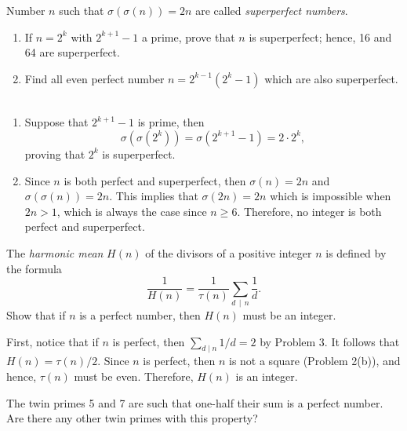 \begin{exercise}
    Number $n$ such that $\sigma(\sigma(n)) = 2n$ are called \textit{superperfect numbers}.
    \begin{enumerate}
        \item If $n = 2^k$ with $2^{k+1} - 1$ a prime, prove that $n$ is superperfect; hence, 16 and 64 are superperfect.
        \item Find all even perfect number $n = 2^{k-1}(2^k - 1)$ which are also superperfect.  \\
    \end{enumerate}
\end{exercise}

\begin{solution}
    \begin{enumerate}
        \item Suppose that $2^{k+1} - 1$ is prime, then
        $$\sigma(\sigma(2^k)) = \sigma(2^{k+1} - 1) = 2\cdot 2^k,$$
        proving that $2^k$ is superperfect.
        \item Since $n$ is both perfect and superperfect, then $\sigma(n) = 2n$ and $\sigma(\sigma(n)) = 2n$. This implies that $\sigma(2n) = 2n$ which is impossible when $2n > 1$, which is always the case since $n \geq 6$. Therefore, no integer is both perfect and superperfect. \\
    \end{enumerate}
\end{solution}

\begin{exercise}
    The \textit{harmonic mean} $H(n)$ of the divisors of a positive integer $n$ is defined by the formula
    $$\frac{1}{H(n)} = \frac{1}{\tau(n)}\sum_{d \, \mid \, n}\frac{1}{d}.$$
    Show that if $n$ is a perfect number, then $H(n)$ must be an integer. \\
\end{exercise}

\begin{solution}
    First, notice that if $n$ is perfect, then $\sum_{d\mid n}1/d = 2$ by Problem 3. It follows that $H(n)= \tau(n)/2$. Since $n$ is perfect, then $n$ is not a square (Problem 2(b)), and hence, $\tau(n)$ must be even. Therefore, $H(n)$ is an integer.\\
\end{solution}

\begin{exercise}
    The twin primes 5 and 7 are such that one-half their sum is a perfect number. Are there any other twin primes with this property?  \\
\end{exercise}

